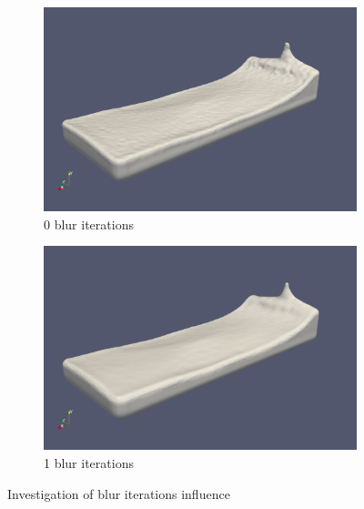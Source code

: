 \begin{figure}
        \begin{subfigure}[b]{\textwidth}
               \includegraphics[width=\textwidth]{figures/ReconstructionIterations0.png}
				\caption{0 blur iterations}
               \label{fig:bi_original}
        \end{subfigure}
        \begin{subfigure}[b]{\textwidth}
               \includegraphics[width=\textwidth]{figures/ReconstructionIterations1.png}
				\caption{1 blur iterations}

				\label{fig:bi_1iteration}
        \end{subfigure}
       \caption{Investigation of blur iterations influence}
       \label{fig:bi_reconstruction1}

\end{figure}


